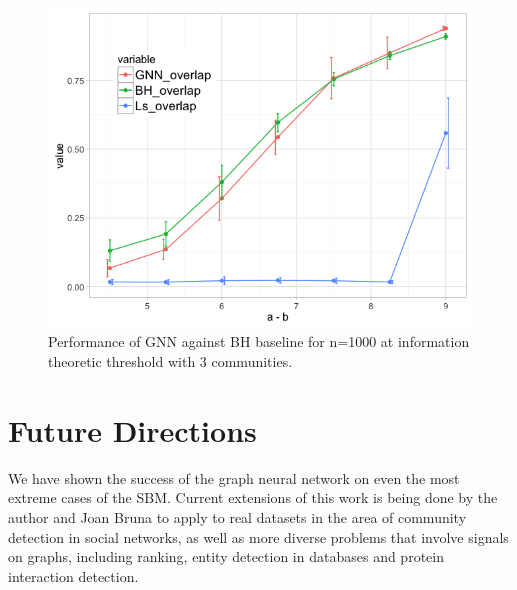 \begin{figure}[H]
\begin{center}
  \includegraphics[scale=0.55]{K3.png}
  \caption{Performance of GNN against BH baseline for n=1000 at information theoretic threshold with 3 communities.}
  \label{fig:k3}
\end{center}
\end{figure}


\section{Future Directions}

We have shown the success of the graph neural network on even the most extreme cases of the SBM.  Current extensions of this work is being done by the author and Joan Bruna to apply to real datasets in the area of community detection in social networks, as well as more diverse problems that involve signals on graphs, including ranking, entity detection in databases and protein interaction detection. 
